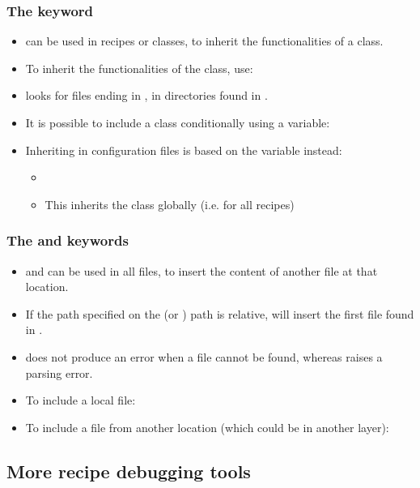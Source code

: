 \begin{frame}
  \frametitle{The  keyword}
  \begin{itemize}
    \item {} can be used in recipes or classes, to inherit
      the functionalities of a class.
    \item To inherit the functionalities of the  class,
      use: 
    \item {} looks for files ending in , in
       directories found in .
    \item It is possible to include a class conditionally using a
      variable: 
    \item Inheriting in configuration files is based on the 
      variable instead:
      \begin{itemize}
        \item {}
        \item This inherits the class globally (i.e. for all recipes)
      \end{itemize}
  \end{itemize}
\end{frame}

\begin{frame}
  \frametitle{The  and  keywords}
  \begin{itemize}
    \item {} and  can be used in all files,
      to insert the content of another file at that location.
    \item If the path specified on the  (or
      ) path is relative,  will insert the first
      file found in .
    \item {} does not produce an error when a file cannot
      be found, whereas  raises a parsing error.
    \item To include a local file: 
    \item To include a file from another location (which could be
      in another layer): 
  \end{itemize}
\end{frame}

\subsection{More recipe debugging tools}

